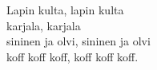
Lapin kulta, lapin kulta \\ karjala, karjala \\ sininen ja olvi, sininen ja olvi \\ koff koff koff, koff koff koff.\\